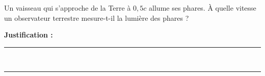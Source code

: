 Un vaisseau qui s'approche de la Terre à $0{,}5c$ allume ses phares. À quelle vitesse un observateur terrestre mesure-t-il la lumière des phares ?

\choices

\noindent\textbf{Justification :} \hrulefill \\[2.5ex]
\rule{\linewidth}{0.4pt} \\[2.5ex]
\rule{\linewidth}{0.4pt}
\vfill
